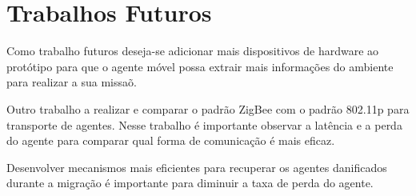 \section{Trabalhos Futuros}

Como trabalho futuros deseja-se adicionar mais dispositivos de hardware ao protótipo para que o agente móvel possa extrair mais informações do ambiente para realizar a sua missaõ.

Outro trabalho a realizar e comparar o padrão ZigBee com o padrão 802.11p para transporte de agentes. Nesse trabalho é importante observar a latência e a perda do agente para comparar qual forma de comunicação é mais eficaz.

Desenvolver mecanismos mais eficientes para recuperar os agentes danificados durante a migração é importante para diminuir a taxa de perda do agente. 
